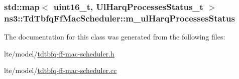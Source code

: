\subsubsection[{\texorpdfstring{m\+\_\+ul\+Harq\+Processes\+Status}{m_ulHarqProcessesStatus}}]{\setlength{\rightskip}{0pt plus 5cm}std\+::map$<$ uint16\+\_\+t, {\bf Ul\+Harq\+Processes\+Status\+\_\+t} $>$ ns3\+::\+Td\+Tbfq\+Ff\+Mac\+Scheduler\+::m\+\_\+ul\+Harq\+Processes\+Status\hspace{0.3cm}{\ttfamily [private]}}\hypertarget{classns3_1_1TdTbfqFfMacScheduler_a845d3e79ce5c38b47c8ac8a7e4cc5b37}{}\label{classns3_1_1TdTbfqFfMacScheduler_a845d3e79ce5c38b47c8ac8a7e4cc5b37}


The documentation for this class was generated from the following files\+:\begin{DoxyCompactItemize}
\item 
lte/model/\hyperlink{lte_2model_2tdtbfq-ff-mac-scheduler_8h}{tdtbfq-\/ff-\/mac-\/scheduler.\+h}\item 
lte/model/\hyperlink{lte_2model_2tdtbfq-ff-mac-scheduler_8cc}{tdtbfq-\/ff-\/mac-\/scheduler.\+cc}\end{DoxyCompactItemize}
